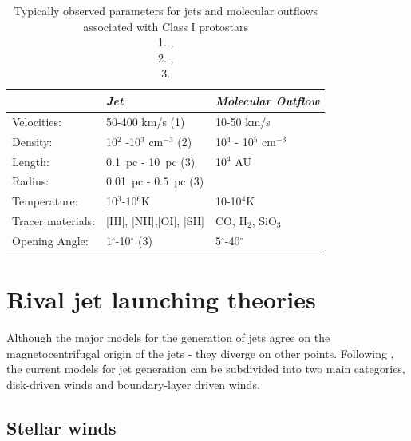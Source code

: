 \begin{table}
\begin{tabular}{|p{3.5cm}|p{4.5cm}|p{4.5cm}|}
\hline
& \emph{Jet} & \emph{Molecular Outflow}
\\
\hline
Velocities:& 50-400 km/s (1) & 10-50 km/s
\\
\hline
Density: &10$^{2}$ -10$^{3}$ cm$^{-3}$ (2) & 10$^4$ - 10$^5$ cm$^{-3}$
\\
\hline
Length: & 0.1~pc - 10~pc (3) & 10$^4$ AU
\\
\hline
Radius: & 0.01~pc - 0.5~pc (3) & 
\\
\hline
Temperature:& 10$^{3}$-10$^6$K &  10-10$^4$K 
\\
\hline
Tracer materials:& [HI], [NII],[OI], [SII] & CO, H$_2$,
SiO$_3$
\\
\hline
Opening Angle: &1$^\circ$-10$^\circ$ (3) & 5$^\circ$-40$^\circ$
\\
\hline
\end{tabular}
\caption{Typically observed parameters for jets and molecular outflows associated with Class I protostars \protect\\1. \citet{2000prpl.conf..815E},\protect\\2. \citet{1999A&A...342..717B},\protect\\3. \citet{1996PhDT........56D} }
\label{tab:mytable}
\end{table}


\section{Rival jet launching theories}

Although the major models for the generation of jets agree on the magnetocentrifugal origin of the jets - they diverge on other points.
Following \citet{1996ARA&A..34..111B}, the current models for jet generation can be subdivided into two main categories, disk-driven winds and boundary-layer driven winds.

\subsection{Stellar winds}

